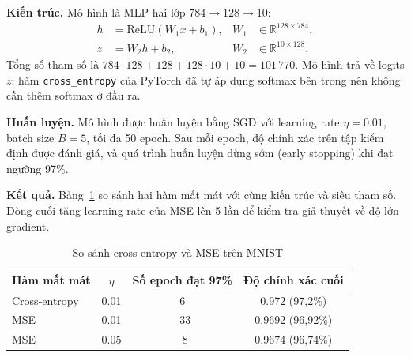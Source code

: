 \textbf{Kiến trúc.} Mô hình là MLP hai lớp
$784 \rightarrow 128 \rightarrow 10$:
\begin{align}
h &= \mathrm{ReLU}(W_1 x + b_1), & W_1 &\in \mathbb{R}^{128 \times 784},\\
z &= W_2 h + b_2, & W_2 &\in \mathbb{R}^{10 \times 128}.
\end{align}
Tổng số tham số là $784 \cdot 128 + 128 + 128 \cdot 10 + 10 = 101\,770$.
Mô hình trả về logits $z$; hàm \texttt{cross\_entropy} của PyTorch đã tự áp
dụng softmax bên trong nên không cần thêm softmax ở đầu ra.

\textbf{Huấn luyện.} Mô hình được huấn luyện bằng SGD với learning rate
$\eta = 0.01$, batch size $B = 5$, tối đa 50 epoch. Sau mỗi epoch, độ chính
xác trên tập kiểm định được đánh giá, và quá trình huấn luyện dừng sớm
(early stopping) khi đạt ngưỡng 97\%.

\textbf{Kết quả.} Bảng~\ref{tab:q3_loss} so sánh hai hàm mất mát với cùng
kiến trúc và siêu tham số. Dòng cuối tăng learning rate của MSE lên 5 lần để
kiểm tra giả thuyết về độ lớn gradient.
\begin{table}[htbp]
\caption{So sánh cross-entropy và MSE trên MNIST}
\label{tab:q3_loss}
\centering
\begin{tabular}{lccc}
\toprule
Hàm mất mát & $\eta$ & Số epoch đạt 97\% & Độ chính xác cuối \\
\midrule
Cross-entropy & 0.01 & 6& 0.972 (97,2\%)\\
MSE           & 0.01 & ~33& 0.9692 (96,92\%)\\
MSE           & 0.05 & ~8& 0.9674 (96,74\%)\\
\bottomrule
\end{tabular}
\end{table}
